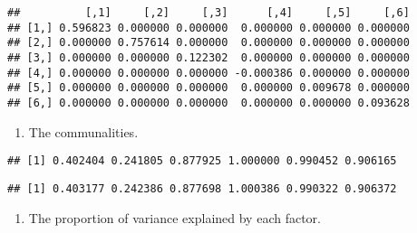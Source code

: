 \documentclass[
]{article}
\newenvironment{Shaded}{\begin{snugshade}}{\end{snugshade}}
\newcommand{\CommentTok}[1]{\textcolor[rgb]{0.56,0.35,0.01}{\textit{#1}}}
\newcommand{\DecValTok}[1]{\textcolor[rgb]{0.00,0.00,0.81}{#1}}
\newcommand{\NormalTok}[1]{#1}
\newcommand{\OtherTok}[1]{\textcolor[rgb]{0.56,0.35,0.01}{#1}}
\newcommand{\SpecialCharTok}[1]{\textcolor[rgb]{0.00,0.00,0.00}{#1}}
\providecommand{\tightlist}{%
  \setlength{\itemsep}{0pt}\setlength{\parskip}{0pt}}
\begin{document}
\begin{verbatim}
##          [,1]     [,2]     [,3]      [,4]     [,5]     [,6]
## [1,] 0.596823 0.000000 0.000000  0.000000 0.000000 0.000000
## [2,] 0.000000 0.757614 0.000000  0.000000 0.000000 0.000000
## [3,] 0.000000 0.000000 0.122302  0.000000 0.000000 0.000000
## [4,] 0.000000 0.000000 0.000000 -0.000386 0.000000 0.000000
## [5,] 0.000000 0.000000 0.000000  0.000000 0.009678 0.000000
## [6,] 0.000000 0.000000 0.000000  0.000000 0.000000 0.093628
\end{verbatim}

\begin{enumerate}
\def\labelenumi{(\alph{enumi})}
\setcounter{enumi}{1}
\tightlist
\item
  The communalities.
\end{enumerate}

\begin{Shaded}
\end{Shaded}

\begin{verbatim}
## [1] 0.402404 0.241805 0.877925 1.000000 0.990452 0.906165
\end{verbatim}

\begin{Shaded}
\end{Shaded}

\begin{verbatim}
## [1] 0.403177 0.242386 0.877698 1.000386 0.990322 0.906372
\end{verbatim}

\begin{enumerate}
\def\labelenumi{(\alph{enumi})}
\setcounter{enumi}{2}
\tightlist
\item
  The proportion of variance explained by each factor.
\end{enumerate}
\end{document}
